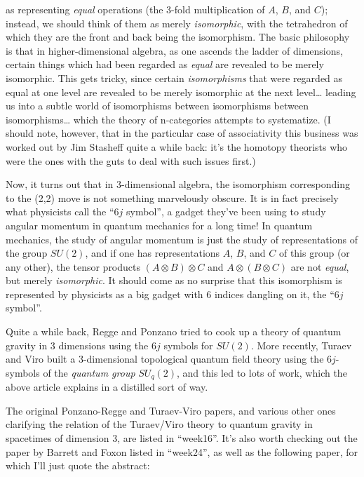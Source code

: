 \documentclass{article}
\begin{document}
as representing \emph{equal} operations (the 3-fold multiplication of
\(A\), \(B\), and \(C\)); instead, we should think of them as merely
\emph{isomorphic}, with the tetrahedron of which they are the front and
back being the isomorphism. The basic philosophy is that in
higher-dimensional algebra, as one ascends the ladder of dimensions,
certain things which had been regarded as \emph{equal} are revealed to
be merely isomorphic. This gets tricky, since certain
\emph{isomorphisms} that were regarded as equal at one level are
revealed to be merely isomorphic at the next level\ldots{} leading us
into a subtle world of isomorphisms between isomorphisms between
isomorphisms\ldots{} which the theory of n-categories attempts to
systematize. (I should note, however, that in the particular case of
associativity this business was worked out by Jim Stasheff quite a while
back: it's the homotopy theorists who were the ones with the guts to
deal with such issues first.)

Now, it turns out that in 3-dimensional algebra, the isomorphism
corresponding to the (2,2) move is not something marvelously obscure. It
is in fact precisely what physicists call the ``\(6j\) symbol'', a
gadget they've been using to study angular momentum in quantum mechanics
for a long time! In quantum mechanics, the study of angular momentum is
just the study of representations of the group \(SU(2)\), and if one has
representations \(A\), \(B\), and \(C\) of this group (or any other),
the tensor products \((A \otimes B) \otimes C\) and
\(A \otimes (B \otimes C)\) are not \emph{equal}, but merely
\emph{isomorphic}. It should come as no surprise that this isomorphism
is represented by physicists as a big gadget with 6 indices dangling on
it, the ``\(6j\) symbol''.

Quite a while back, Regge and Ponzano tried to cook up a theory of
quantum gravity in 3 dimensions using the \(6j\) symbols for \(SU(2)\).
More recently, Turaev and Viro built a 3-dimensional topological quantum
field theory using the \(6j\)-symbols of the \emph{quantum group}
\(SU_q(2)\), and this led to lots of work, which the above article
explains in a distilled sort of way.

The original Ponzano-Regge and Turaev-Viro papers, and various other
ones clarifying the relation of the Turaev/Viro theory to quantum
gravity in spacetimes of dimension 3, are listed in ``week16''. It's
also worth checking out the paper by Barrett and Foxon listed in
``week24'', as well as the following paper, for which I'll just quote
the abstract:
\end{document}
